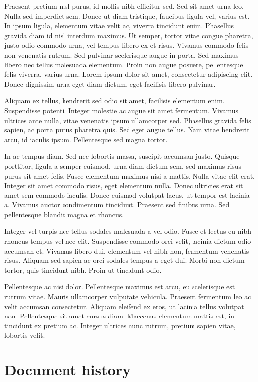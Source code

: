 \documentclass[10pt, a4paper]{article} %
\begin{document}
Praesent pretium nisl purus, id mollis nibh efficitur sed. Sed sit amet urna leo. Nulla sed imperdiet sem. Donec ut diam tristique, faucibus ligula vel, varius est. In ipsum ligula, elementum vitae velit ac, viverra tincidunt enim. Phasellus gravida diam id nisl interdum maximus. Ut semper, tortor vitae congue pharetra, justo odio commodo urna, vel tempus libero ex et risus. Vivamus commodo felis non venenatis rutrum. Sed pulvinar scelerisque augue in porta. Sed maximus libero nec tellus malesuada elementum. Proin non augue posuere, pellentesque felis viverra, varius urna. Lorem ipsum dolor sit amet, consectetur adipiscing elit. Donec dignissim urna eget diam dictum, eget facilisis libero pulvinar.

Aliquam ex tellus, hendrerit sed odio sit amet, facilisis elementum enim. Suspendisse potenti. Integer molestie ac augue sit amet fermentum. Vivamus ultrices ante nulla, vitae venenatis ipsum ullamcorper sed. Phasellus gravida felis sapien, ac porta purus pharetra quis. Sed eget augue tellus. Nam vitae hendrerit arcu, id iaculis ipsum. Pellentesque sed magna tortor.

In ac tempus diam. Sed nec lobortis massa, suscipit accumsan justo. Quisque porttitor, ligula a semper euismod, urna diam dictum sem, sed maximus risus purus sit amet felis. Fusce elementum maximus nisi a mattis. Nulla vitae elit erat. Integer sit amet commodo risus, eget elementum nulla. Donec ultricies erat sit amet sem commodo iaculis. Donec euismod volutpat lacus, ut tempor est lacinia a. Vivamus auctor condimentum tincidunt. Praesent sed finibus urna. Sed pellentesque blandit magna et rhoncus.

Integer vel turpis nec tellus sodales malesuada a vel odio. Fusce et lectus eu nibh rhoncus tempus vel nec elit. Suspendisse commodo orci velit, lacinia dictum odio accumsan et. Vivamus libero dui, elementum vel nibh non, fermentum venenatis risus. Aliquam sed sapien ac orci sodales tempus a eget dui. Morbi non dictum tortor, quis tincidunt nibh. Proin ut tincidunt odio.

Pellentesque ac nisi dolor. Pellentesque maximus est arcu, eu scelerisque est rutrum vitae. Mauris ullamcorper vulputate vehicula. Praesent fermentum leo ac velit accumsan consectetur. Aliquam eleifend ex eros, ut lacinia tellus volutpat non. Pellentesque sit amet cursus diam. Maecenas elementum mattis est, in tincidunt ex pretium ac. Integer ultrices nunc rutrum, pretium sapien vitae, lobortis velit.

\appendix

\section{Document history} \label{sec:document-history}



\printbibliography[title={Bibliography}] %

\end{document}
